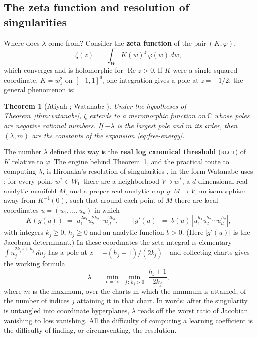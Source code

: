 \documentclass[11pt]{amsart}
\theoremstyle{plain}
\newtheorem{theorem}{Theorem}[section]
\theoremstyle{definition}
\begin{document}
\subsection{The zeta function and resolution of singularities}\label{subsec:zeta}

Where does $\lambda$ come from? Consider the \textbf{zeta function} of the pair $(K, \varphi)$,
\[
   \zeta(z) \;=\; \int_W K(w)^z \,\varphi(w)\,dw ,
\]
which converges and is holomorphic for $\operatorname{Re} z > 0$. If $K$ were a single squared coordinate, $K = w_1^2$ on $[-1,1]^d$, one integration gives a pole at $z = -1/2$; the general phenomenon is:

\begin{theorem}[Atiyah \cite{atiyah1970}; Watanabe {\cite[Ch.~4]{watanabe2009}}]\label{thm:zeta}
Under the hypotheses of Theorem~\textup{\ref{thm:watanabe}}, $\zeta$ extends to a meromorphic function on $\mathbb{C}$ whose poles are negative rational numbers. If $-\lambda$ is the largest pole and $m$ its order, then $(\lambda, m)$ are the constants of the expansion \eqref{eq:free-energy}.
\end{theorem}

The number $\lambda$ defined this way is the \textbf{real log canonical threshold} (\textsc{rlct}) of $K$ relative to $\varphi$. The engine behind Theorem~\ref{thm:zeta}, and the practical route to computing $\lambda$, is Hironaka's resolution of singularities \cite{hironaka1964}, in the form Watanabe uses \cite[Ch.~3]{watanabe2009}: for every point $w^* \in W_0$ there are a neighborhood $V \ni w^*$, a $d$-dimensional real-analytic manifold $M$, and a proper real-analytic map $g \colon M \to V$, an isomorphism away from $K^{-1}(0)$, such that around each point of $M$ there are local coordinates $u = (u_1,\dots,u_d)$ in which
\[
   K(g(u)) \;=\; u_1^{2k_1} u_2^{2k_2} \cdots u_d^{2k_d},
   \qquad
   |g'(u)| \;=\; b(u)\,|u_1^{h_1} u_2^{h_2}\cdots u_d^{h_d}| ,
\]
with integers $k_j \geq 0$, $h_j \geq 0$ and an analytic function $b > 0$. (Here $|g'(u)|$ is the Jacobian determinant.) In these coordinates the zeta integral is elementary---$\int u_j^{2k_j z + h_j}\,du_j$ has a pole at $z = -(h_j+1)/(2k_j)$---and collecting charts gives the working formula
\begin{equation}\label{eq:rlct-formula}
   \lambda \;=\; \min_{\text{charts}} \; \min_{j \,:\, k_j > 0} \; \frac{h_j + 1}{2 k_j},
\end{equation}
where $m$ is the maximum, over the charts in which the minimum is attained, of the number of indices $j$ attaining it in that chart. In words: after the singularity is untangled into coordinate hyperplanes, $\lambda$ reads off the worst ratio of Jacobian vanishing to loss vanishing. All the difficulty of computing a learning coefficient is the difficulty of finding, or circumventing, the resolution.
\end{document}
